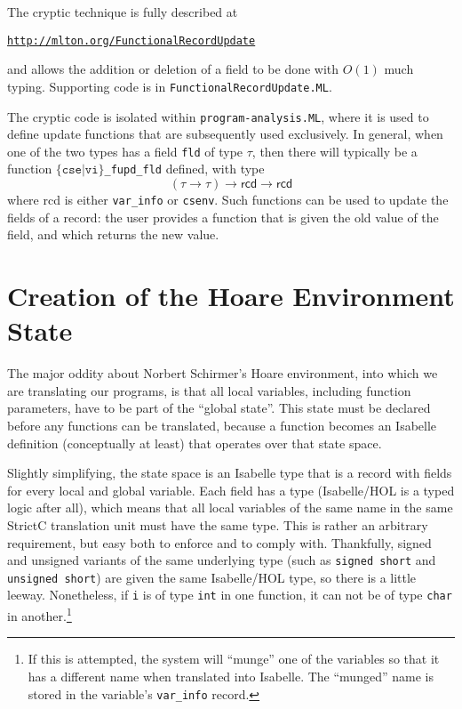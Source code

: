 \documentclass{article}
\newcommand{\strictc}{\textsf{StrictC}}
\newcommand{\MLsuffix}{.ML}
\newcommand{\srcfile}[1]{\texttt{#1}}
\newcommand{\MLfile}[1]{\srcfile{#1\MLsuffix}}
\begin{document}
The cryptic technique is fully described at
\begin{alltt}
   \url{http://mlton.org/FunctionalRecordUpdate}
\end{alltt}
and allows the addition or deletion of a field to be done with $O(1)$
much typing.  Supporting code is in \MLfile{FunctionalRecordUpdate}.

The cryptic code is isolated within \MLfile{program-analysis},
where it is used to define update functions that are subsequently used
exclusively.  In general, when one of the two types has a field
\texttt{fld} of type $\tau$, then there will typically be a function
$\{\texttt{cse}|\texttt{vi}\}$\texttt{_fupd_fld} defined, with type
\[
  (\tau \rightarrow \tau) \rightarrow \textsf{rcd} \rightarrow
  \textsf{rcd}
\]
where \textsf{rcd} is either \texttt{var_info} or \texttt{csenv}.
Such functions can be used to update the fields of a record: the user
provides a function that is given the old value of the field, and
which returns the new value.



\section{Creation of the Hoare Environment State}
\label{sec:hoare-state}

The major oddity about Norbert Schirmer's Hoare environment, into which
we are translating our programs, is that all local variables, including
function parameters, have to be part of the ``global state''.  This
state must be declared before any functions can be translated,
because a function becomes an Isabelle definition (conceptually at
least) that operates over that state space.

Slightly simplifying, the state space is an Isabelle type that is a
record with fields for every local and global variable.  Each field
has a type (Isabelle/HOL is a typed logic after all), which means that
all local variables of the same name in the same \strictc{} translation
unit must have the same type.  This is rather an arbitrary
requirement, but easy both to enforce and to comply with.  Thankfully,
signed and unsigned variants of the same underlying type (such as
\texttt{signed~short} and \texttt{unsigned~short}) are given the same
Isabelle/HOL type, so there is a little leeway.  Nonetheless, if
\texttt{i} is of type \texttt{int} in one function, it can not be of
type \texttt{char} in another.\footnote{If this is attempted, the
  system will ``munge'' one of the variables so that it has a
  different name when translated into Isabelle.  The ``munged'' name
  is stored in the variable's \texttt{var_info} record.}
\end{document}
